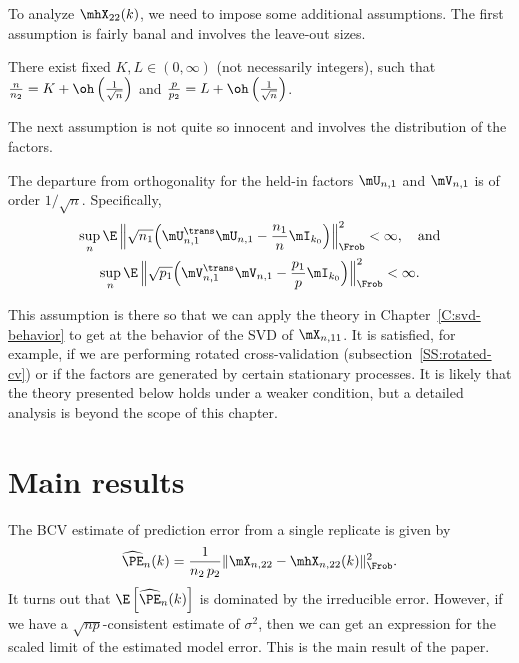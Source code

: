 To analyze $\mhX_{22}(k)$, we need to impose some additional assumptions.
The first assumption is fairly banal and involves the leave-out sizes.

\begin{assumption}
    There exist fixed $K, L \in (0, \infty)$ (not necessarily integers),
    such that
    $\frac{n}{n_2} = K + \oh\left(\frac{1}{\sqrt{n}}\right)$ and 
	$\frac{p}{p_2} = L + \oh\left(\frac{1}{\sqrt{n}}\right)$.
\end{assumption}

\noindent
The next assumption is not quite so innocent and involves the distribution of the factors.

\begin{assumption}\label{A:held-in-orthog}
    The departure from orthogonality for the held-in factors $\mU_{n,1}$
    and $\mV_{n,1}$ is of order $1/\sqrt{n}$.  Specifically,
    \begin{gather*}
        \sup_n 
        \E \, \Big\| 
            \sqrt{n_1} 
            \Big( 
                \mU_{n,1}^\trans \mU_{n,1} 
                -
                \frac{n_1}{n} \mI_{k_0}
            \Big)
        \Big\|_\Frob^2
        <
        \infty, \quad\text{and} \\
        \sup_n
        \E \, \Big\| 
            \sqrt{p_1} 
            \Big( 
                \mV_{n,1}^\trans \mV_{n,1} 
                -
                \frac{p_1}{p} \mI_{k_0}
            \Big)
        \Big\|_\Frob^2
        <
        \infty.
    \end{gather*}
\end{assumption}

\noindent
This assumption is there so that we can apply the theory in Chapter~\ref{C:svd-behavior} to get at the behavior of the SVD of $\mX_{n,11}$.  It is satisfied, for example, if we are performing rotated cross-validation (subsection~\ref{SS:rotated-cv}) or if the factors are generated by certain stationary processes.  It is likely that the theory presented below holds under a weaker condition, but a detailed analysis is beyond the scope of this chapter.


\section{Main results}

The BCV estimate of prediction error from a single replicate is given
by
\[
	\widehat{\PE}_n(k)
		=
			\frac{1}{n_2 \, p_2}
			\| \mX_{n,22} - \mhX_{n,22}(k) \|_\Frob^2.
\]
It turns out that
\(
	\E\left[
		\widehat{\PE}_n(k)
	\right]
\)
is dominated by the irreducible error.  However, if we have a $\sqrt{n p}$-consistent estimate of $\sigma^2$, then we can get an expression for
the scaled limit of the estimated model error.  This is the main result of
the paper.

